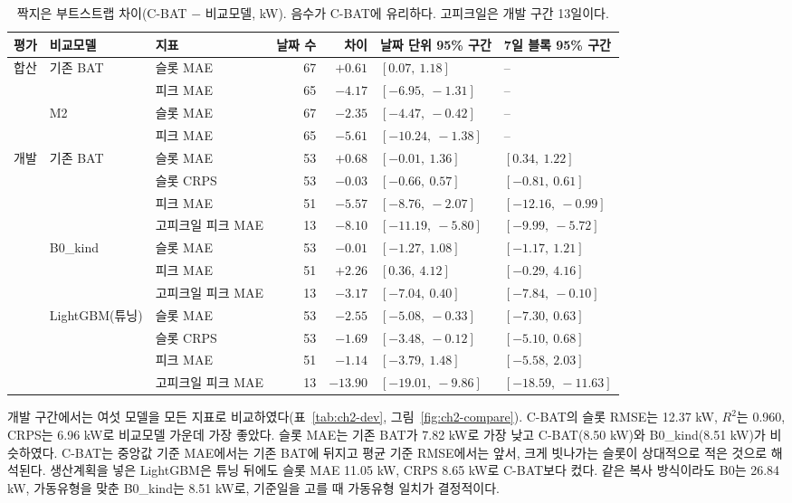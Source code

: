 \begin{table}[htbp]
\centering
\hwptablefont
\setlength{\tabcolsep}{4pt}
\caption{짝지은 부트스트랩 차이(C-BAT $-$ 비교모델, kW). 음수가 C-BAT에 유리하다. 고피크일은 개발 구간 13일이다.}\label{tab:ch2-boot}
\begin{tabular}{lllrrll}
\toprule
평가 & 비교모델 & 지표 & 날짜 수 & 차이 & 날짜 단위 95\% 구간 & 7일 블록 95\% 구간 \\
\midrule
합산 & 기존 BAT & 슬롯 MAE & 67 & $+0.61$ & $[0.07,\ 1.18]$ & -- \\
 & & 피크 MAE & 65 & $-4.17$ & $[-6.95,\ -1.31]$ & -- \\
 & M2 & 슬롯 MAE & 67 & $-2.35$ & $[-4.47,\ -0.42]$ & -- \\
 & & 피크 MAE & 65 & $-5.61$ & $[-10.24,\ -1.38]$ & -- \\
\midrule
개발 & 기존 BAT & 슬롯 MAE & 53 & $+0.68$ & $[-0.01,\ 1.36]$ & $[0.34,\ 1.22]$ \\
 & & 슬롯 CRPS & 53 & $-0.03$ & $[-0.66,\ 0.57]$ & $[-0.81,\ 0.61]$ \\
 & & 피크 MAE & 51 & $-5.57$ & $[-8.76,\ -2.07]$ & $[-12.16,\ -0.99]$ \\
 & & 고피크일 피크 MAE & 13 & $-8.10$ & $[-11.19,\ -5.80]$ & $[-9.99,\ -5.72]$ \\
 & B0\_kind & 슬롯 MAE & 53 & $-0.01$ & $[-1.27,\ 1.08]$ & $[-1.17,\ 1.21]$ \\
 & & 피크 MAE & 51 & $+2.26$ & $[0.36,\ 4.12]$ & $[-0.29,\ 4.16]$ \\
 & & 고피크일 피크 MAE & 13 & $-3.17$ & $[-7.04,\ 0.40]$ & $[-7.84,\ -0.10]$ \\
 & LightGBM(튜닝) & 슬롯 MAE & 53 & $-2.55$ & $[-5.08,\ -0.33]$ & $[-7.30,\ 0.63]$ \\
 & & 슬롯 CRPS & 53 & $-1.69$ & $[-3.48,\ -0.12]$ & $[-5.10,\ 0.68]$ \\
 & & 피크 MAE & 51 & $-1.14$ & $[-3.79,\ 1.48]$ & $[-5.58,\ 2.03]$ \\
 & & 고피크일 피크 MAE & 13 & $-13.90$ & $[-19.01,\ -9.86]$ & $[-18.59,\ -11.63]$ \\
\bottomrule
\end{tabular}
\end{table}

개발 구간에서는 여섯 모델을 모든 지표로 비교하였다(표~\ref{tab:ch2-dev}, 그림~\ref{fig:ch2-compare}). C-BAT의 슬롯 RMSE는 12.37 kW, $R^2$는 0.960, CRPS는 6.96 kW로 비교모델 가운데 가장 좋았다. 슬롯 MAE는 기존 BAT가 7.82 kW로 가장 낮고 C-BAT(8.50 kW)와 B0\_kind(8.51 kW)가 비슷하였다. C-BAT는 중앙값 기준 MAE에서는 기존 BAT에 뒤지고 평균 기준 RMSE에서는 앞서, 크게 빗나가는 슬롯이 상대적으로 적은 것으로 해석된다. 생산계획을 넣은 LightGBM은 튜닝 뒤에도 슬롯 MAE 11.05 kW, CRPS 8.65 kW로 C-BAT보다 컸다. 같은 복사 방식이라도 B0는 26.84 kW, 가동유형을 맞춘 B0\_kind는 8.51 kW로, 기준일을 고를 때 가동유형 일치가 결정적이다.

